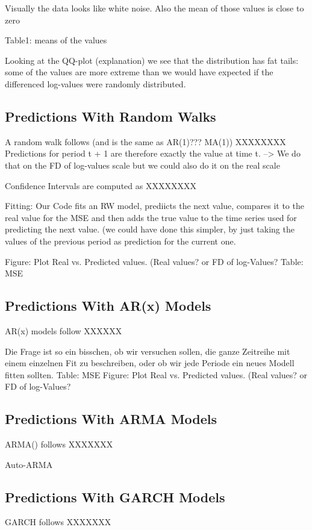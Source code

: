 Visually the data looks like white noise. Also the mean of those values is close to zero

Table1: means of the values

Looking at the QQ-plot (explanation) we see that the distribution has fat tails: some of the values are more extreme than we would have expected if the differenced log-values were randomly distributed. 


\subsection{Predictions With Random Walks}
A random walk follows (and is the same as AR(1)??? MA(1))
XXXXXXXX
Predictions for period t + 1 are therefore exactly the value at time t. --> We do that on the FD of log-values scale but we could also do it on the real scale

Confidence Intervals are computed as
XXXXXXXX

Fitting: 
Our Code fits an RW model, prediicts the next value, compares it to the real value for the MSE and then adds the true value to the time series used for predicting the next value. (we could have done this simpler, by just taking the values of the previous period as prediction for the current one. 

Figure: Plot Real vs. Predicted values. (Real values? or FD of log-Values?
Table: MSE

\subsection{Predictions With AR(x) Models}
AR(x) models follow
XXXXXX

Die Frage ist so ein bisschen, ob wir versuchen sollen, die ganze Zeitreihe mit einem einzelnen Fit zu beschreiben, oder ob wir jede Periode ein neues Modell fitten sollten. 
Table: MSE
Figure: Plot Real vs. Predicted values. (Real values? or FD of log-Values?

\subsection{Predictions With ARMA Models}
ARMA() follows
XXXXXXX


Auto-ARMA


\subsection{Predictions With GARCH Models}
GARCH follows 
XXXXXXX

